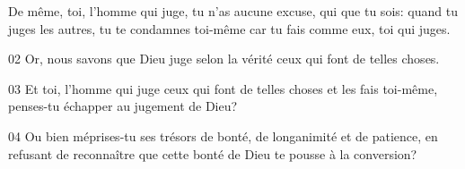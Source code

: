De même, toi, l’homme qui juge, tu n’as aucune excuse, qui que tu sois: quand tu juges les autres, tu te condamnes toi-même car tu fais comme eux, toi qui juges.

02 Or, nous savons que Dieu juge selon la vérité ceux qui font de telles choses.

03 Et toi, l’homme qui juge ceux qui font de telles choses et les fais toi-même, penses-tu échapper au jugement de Dieu?

04 Ou bien méprises-tu ses trésors de bonté, de longanimité et de patience, en refusant de reconnaître que cette bonté de Dieu te pousse à la conversion?
